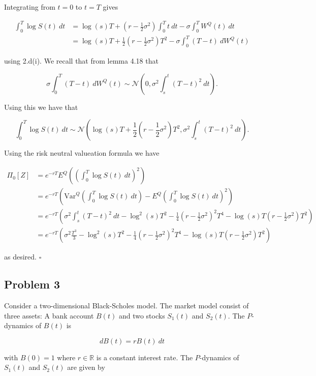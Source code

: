 \documentclass[
]{book}
\begin{document}
Integrating from \(t=0\) to \(t=T\) gives

\begin{align*}
\int_0^T \log S(t)\ dt&=\log(s)T+\left(r-\frac{1}{2}\sigma^2\right)\int_0^T t\ dt-\sigma\int_0^T W^Q(t)\ dt\\
&=\log(s)T+\frac{1}{2}\left(r-\frac{1}{2}\sigma^2\right)T^2-\sigma\int_0^T (T-t)\ dW^Q(t)
\end{align*}

using 2.d(i). We recall that from lemma 4.18 that

\[
\sigma\int_0^T (T-t)\ dW^Q(t)\sim \mathcal{N}\left(0,\sigma^2\int_s^t(T-t)^2\ dt\right).
\]

Using this we have that

\[
\int_0^T \log S(t)\ dt\sim\mathcal{N}\left(\log(s)T+\frac{1}{2}\left(r-\frac{1}{2}\sigma^2\right)T^2,\sigma^2\int_s^t(T-t)^2\ dt\right).
\]

Using the risk neutral valueation formula we have

\begin{align*}
\Pi_0[Z]&=e^{-rT}E^Q\left(\left(\int_0^T \log S(t)\ dt\right)^2\right)\\
&=e^{-rT}\left(\text{Var}^Q\left(\int_0^T \log S(t)\ dt\right)-E^Q\left(\int_0^T \log S(t)\ dt\right)^2\right)\\
&=e^{-rT}\left(\sigma^2\int_s^t(T-t)^2\ dt-\log^2(s)T^2-\frac{1}{4}\left(r-\frac{1}{2}\sigma^2\right)^2T^4-\log(s)T\left(r-\frac{1}{2}\sigma^2\right)T^2\right)\\
&=e^{-rT}\left(\sigma^2\frac{T^3}{3}-\log^2(s)T^2-\frac{1}{4}\left(r-\frac{1}{2}\sigma^2\right)^2T^4-\log(s)T\left(r-\frac{1}{2}\sigma^2\right)T^2\right)
\end{align*}

as desired. \(\square\)

\noindent\makebox[\linewidth]{\rule{\textwidth}{0.4pt}}

\hypertarget{problem-3-3}{%
\subsection{Problem 3}\label{problem-3-3}}

Consider a two-dimensional Black-Scholes model. The market model consist of three assets: A bank account \(B(t)\) and two stocks \(S_1(t)\) and \(S_2(t)\). The \(P\)-dynamics of \(B(t)\) is

\[
dB(t)=rB(t)\ dt
\]

with \(B(0)=1\) where \(r\in\mathbb{R}\) is a constant interest rate. The \(P\)-dynamics of \(S_1(t)\) and \(S_2(t)\) are given by
\end{document}

